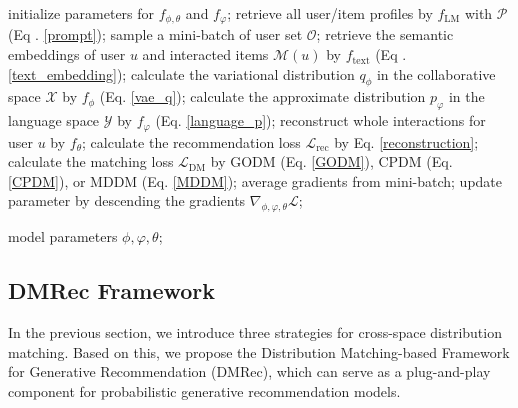 \documentclass[sigconf]{acmart}
\begin{document}
\begin{algorithm}
\caption{The training process of \textsf{DMRec}}
\label{algorithms}
\begin{algorithmic}[1]
\STATE initialize parameters for $f_{\phi, \theta}$ and $f_\varphi$;
\STATE retrieve all user/item profiles by $f_{\text{LM}}$ with  $\mathcal P$ (Eq . \ref{prompt});
\STATE sample a mini-batch of user set $\mathcal O$;
\STATE retrieve the semantic embeddings of user $u$ and interacted items $\mathcal M(u)$ by $f_{\text{text}}$ (Eq . \ref{text_embedding});
\STATE calculate the variational distribution $q_{\phi}$ in the collaborative space $\mathcal X$ by $f_{\phi}$ (Eq. \ref{vae_q});
\STATE calculate the approximate distribution $p_{\varphi}$ in the language space $\mathcal Y$ by $f_\varphi$ (Eq. \ref{language_p});
\STATE reconstruct whole interactions for user $u$ by $f_{\theta}$;
\STATE calculate the recommendation loss $\mathcal L_{\text{rec}}$ by Eq. \ref{reconstruction};
\STATE calculate the matching loss $\mathcal L_{\text{DM}}$ by GODM (Eq. \ref{GODM}), CPDM (Eq. \ref{CPDM}), or MDDM (Eq. \ref{MDDM});
\ENDFOR
\STATE average gradients from mini-batch;
\STATE update parameter by descending the gradients $\nabla_{\phi, \varphi, \theta}\mathcal L$;

\ENDWHILE
\RETURN model parameters $\phi, \varphi, \theta$;
\end{algorithmic}
\end{algorithm}

\subsection{DMRec Framework}

In the previous section, we introduce three strategies for cross-space distribution matching. Based on this, we propose the Distribution Matching-based Framework for Generative Recommendation (\textsf{DMRec}), which can serve as a plug-and-play component for probabilistic generative recommendation models.
\end{document}
